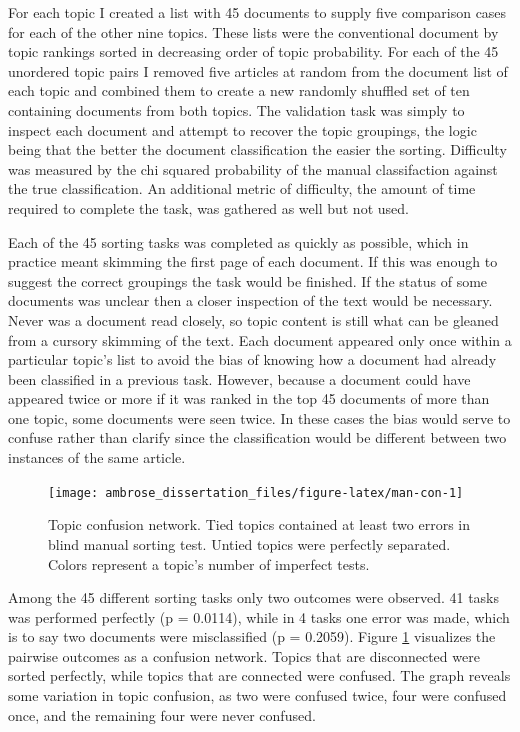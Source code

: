 \documentclass[]{book}
\theoremstyle{definition}
\theoremstyle{definition}
\theoremstyle{definition}
\theoremstyle{remark}
\begin{document}
For each topic I created a list with 45 documents to supply five
comparison cases for each of the other nine topics. These lists were the
conventional document by topic rankings sorted in decreasing order of
topic probability. For each of the 45 unordered topic pairs I removed
five articles at random from the document list of each topic and
combined them to create a new randomly shuffled set of ten containing
documents from both topics. The validation task was simply to inspect
each document and attempt to recover the topic groupings, the logic
being that the better the document classification the easier the
sorting. Difficulty was measured by the chi squared probability of the
manual classifaction against the true classification. An additional
metric of difficulty, the amount of time required to complete the task,
was gathered as well but not used.

Each of the 45 sorting tasks was completed as quickly as possible, which
in practice meant skimming the first page of each document. If this was
enough to suggest the correct groupings the task would be finished. If
the status of some documents was unclear then a closer inspection of the
text would be necessary. Never was a document read closely, so topic
content is still what can be gleaned from a cursory skimming of the
text. Each document appeared only once within a particular topic's list
to avoid the bias of knowing how a document had already been classified
in a previous task. However, because a document could have appeared
twice or more if it was ranked in the top 45 documents of more than one
topic, some documents were seen twice. In these cases the bias would
serve to confuse rather than clarify since the classification would be
different between two instances of the same article.

\begin{figure}

{\centering \texttt{[image: ambrose\_dissertation\_files/figure-latex/man-con-1]} 

}

\caption{Topic confusion network. Tied topics contained at least two errors in blind manual sorting test. Untied topics were perfectly separated. Colors represent a topic's number of imperfect tests.}\label{fig:man-con}
\end{figure}

Among the 45 different sorting tasks only two outcomes were observed. 41
tasks was performed perfectly (p = 0.0114), while in 4 tasks one error
was made, which is to say two documents were misclassified (p = 0.2059).
Figure \ref{fig:man-con} visualizes the pairwise outcomes as a confusion
network. Topics that are disconnected were sorted perfectly, while
topics that are connected were confused. The graph reveals some
variation in topic confusion, as two were confused twice, four were
confused once, and the remaining four were never confused.
\end{document}
